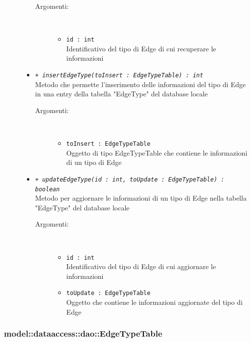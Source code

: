 \documentclass[../DefinizioneDiProdotto.tex]{subfiles}
\begin{document}
\begin{description}
\begin{itemize}
\begin{description}
\item[Argomenti:] \
\begin{itemize}
\item \texttt{id : int}\\
Identificativo del tipo di Edge di cui recuperare le informazioni\end{itemize}
\end{description}
\item \texttt{+ \textit{insertEdgeType(toInsert : EdgeTypeTable) : int}}\\
Metodo che permette l'inserimento delle informazioni del tipo di Edge in una entry della tabella "EdgeType" del database locale
 \begin{description}
\item[Argomenti:] \
\begin{itemize}
\item \texttt{toInsert : EdgeTypeTable}\\
Oggetto di tipo EdgeTypeTable che contiene le informazioni di un tipo di Edge\end{itemize}
\end{description}
\item \texttt{+ \textit{updateEdgeType(id : int, toUpdate : EdgeTypeTable) : boolean}}\\
Metodo per aggiornare le informazioni di un tipo di Edge nella tabella "EdgeType" del database locale
 \begin{description}
\item[Argomenti:] \
\begin{itemize}
\item \texttt{id : int}\\
Identificativo del tipo di Edge di cui aggiornare le informazioni\item \texttt{toUpdate : EdgeTypeTable}\\
Oggetto che contiene le informazioni aggiornate del tipo di Edge\end{itemize}
\end{description}
\end{itemize}
\end{description}

\subsubsection{model::dataaccess::dao::EdgeTypeTable}
\end{document}

